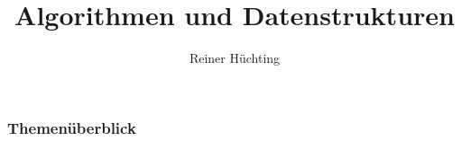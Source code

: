 

\title{Algorithmen und Datenstrukturen}
\author{Reiner Hüchting}


    \begin{frame}
        \titlepage
    \end{frame}

    \begin{frame}
        \frametitle{Themenüberblick}
        \tableofcontents[hideallsubsections]
    \end{frame}

